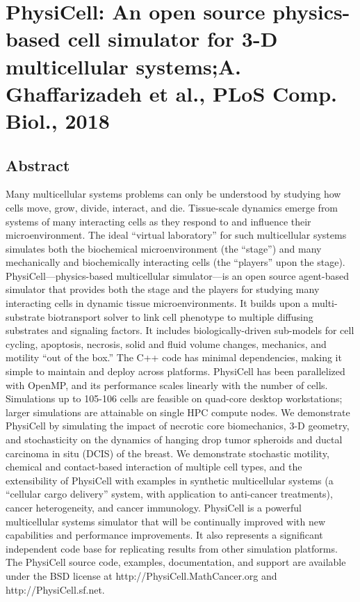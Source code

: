 \documentclass[11pt,a4paper]{article}
\begin{document}
\section*{PhysiCell: An open source physics-based cell simulator for 3-D multicellular systems;A. Ghaffarizadeh et al., \textbf{PLoS Comp. Biol.}, 2018}
\subsection*{Abstract}
Many multicellular systems problems can only be understood by studying how cells move, grow, divide, interact, and die. Tissue-scale dynamics emerge from systems of many interacting cells as they respond to and influence their microenvironment. The ideal “virtual laboratory” for such multicellular systems simulates both the biochemical microenvironment (the “stage”) and many mechanically and biochemically interacting cells (the “players” upon the stage). PhysiCell—physics-based multicellular simulator—is an open source agent-based simulator that provides both the stage and the players for studying many interacting cells in dynamic tissue microenvironments. It builds upon a multi-substrate biotransport solver to link cell phenotype to multiple diffusing substrates and signaling factors. It includes biologically-driven sub-models for cell cycling, apoptosis, necrosis, solid and fluid volume changes, mechanics, and motility “out of the box.” The C++ code has minimal dependencies, making it simple to maintain and deploy across platforms. PhysiCell has been parallelized with OpenMP, and its performance scales linearly with the number of cells. Simulations up to 105-106 cells are feasible on quad-core desktop workstations; larger simulations are attainable on single HPC compute nodes. We demonstrate PhysiCell by simulating the impact of necrotic core biomechanics, 3-D geometry, and stochasticity on the dynamics of hanging drop tumor spheroids and ductal carcinoma in situ (DCIS) of the breast. We demonstrate stochastic motility, chemical and contact-based interaction of multiple cell types, and the extensibility of PhysiCell with examples in synthetic multicellular systems (a “cellular cargo delivery” system, with application to anti-cancer treatments), cancer heterogeneity, and cancer immunology. PhysiCell is a powerful multicellular systems simulator that will be continually improved with new capabilities and performance improvements. It also represents a significant independent code base for replicating results from other simulation platforms. The PhysiCell source code, examples, documentation, and support are available under the BSD license at http://PhysiCell.MathCancer.org and http://PhysiCell.sf.net.
\end{document}
